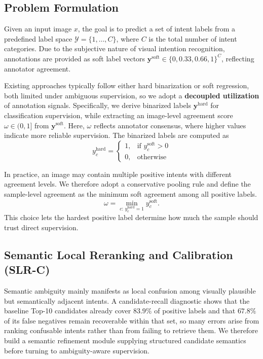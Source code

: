\subsection{Problem Formulation}
\label{sec:problem}

Given an input image $x$, the goal is to predict a set of intent labels from a predefined label space $\mathcal{Y}=\{1,\dots,C\}$, where $C$ is the total number of intent categories. Due to the subjective nature of visual intention recognition, annotations are provided as soft label vectors $\mathbf{y}^{\text{soft}} \in \{0, 0.33, 0.66, 1\}^C$, reflecting annotator agreement.

Existing approaches typically follow either hard binarization or soft regression, both limited under ambiguous supervision, so we adopt a \textbf{decoupled utilization} of annotation signals. Specifically, we derive binarized labels $\mathbf{y}^{\text{hard}}$ for classification supervision, while extracting an image-level agreement score $\omega \in (0,1]$ from $\mathbf{y}^{\text{soft}}$. Here, $\omega$ reflects annotator consensus, where higher values indicate more reliable supervision. The binarized labels are computed as
\begin{equation}
y^{\text{hard}}_{c} =
\begin{cases}
1, & \text{if } y^{\text{soft}}_{c} > 0 \\
0, & \text{otherwise}
\end{cases}
\end{equation}

In practice, an image may contain multiple positive intents with different agreement levels. We therefore adopt a conservative pooling rule and define the sample-level agreement as the minimum soft agreement among all positive labels.
\begin{equation}
\omega = \min_{c:\, y^{\text{hard}}_{c}=1} y^{\text{soft}}_{c}.
\end{equation}
This choice lets the hardest positive label determine how much the sample should trust direct supervision.

\subsection{Semantic Local Reranking and Calibration (SLR-C)}
\label{sec:slrc}

Semantic ambiguity mainly manifests as local confusion among visually plausible but semantically adjacent intents. A candidate-recall diagnostic shows that the baseline Top-10 candidates already cover $83.9\%$ of positive labels and that $67.8\%$ of its false negatives remain recoverable within that set, so many errors arise from ranking confusable intents rather than from failing to retrieve them. We therefore build a semantic refinement module supplying structured candidate semantics before turning to ambiguity-aware supervision.


